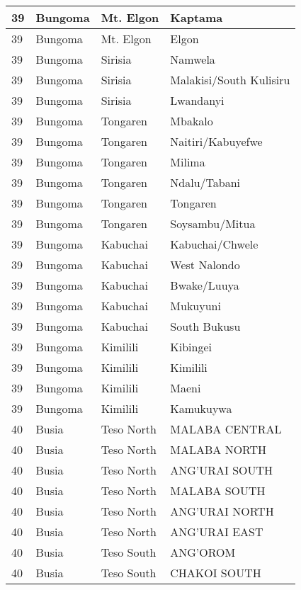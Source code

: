 \begin{table}[!ht]
\begin{tabular}{|l|l|l|l|}
        39 & Bungoma & Mt. Elgon & Kaptama \\ \hline
        39 & Bungoma & Mt. Elgon & Elgon \\ \hline
        39 & Bungoma & Sirisia & Namwela \\ \hline
        39 & Bungoma & Sirisia & Malakisi/South Kulisiru \\ \hline
        39 & Bungoma & Sirisia & Lwandanyi \\ \hline
        39 & Bungoma & Tongaren & Mbakalo \\ \hline
        39 & Bungoma & Tongaren & Naitiri/Kabuyefwe \\ \hline
        39 & Bungoma & Tongaren & Milima \\ \hline
        39 & Bungoma & Tongaren & Ndalu/Tabani \\ \hline
        39 & Bungoma & Tongaren & Tongaren \\ \hline
        39 & Bungoma & Tongaren & Soysambu/Mitua \\ \hline
        39 & Bungoma & Kabuchai & Kabuchai/Chwele \\ \hline
        39 & Bungoma & Kabuchai & West Nalondo \\ \hline
        39 & Bungoma & Kabuchai & Bwake/Luuya \\ \hline
        39 & Bungoma & Kabuchai & Mukuyuni \\ \hline
        39 & Bungoma & Kabuchai & South Bukusu \\ \hline
        39 & Bungoma & Kimilili & Kibingei \\ \hline
        39 & Bungoma & Kimilili & Kimilili \\ \hline
        39 & Bungoma & Kimilili & Maeni \\ \hline
        39 & Bungoma & Kimilili & Kamukuywa \\ \hline
        40 & Busia & Teso North & MALABA CENTRAL \\ \hline
        40 & Busia & Teso North & MALABA NORTH \\ \hline
        40 & Busia & Teso North & ANG’URAI SOUTH \\ \hline
        40 & Busia & Teso North & MALABA SOUTH \\ \hline
        40 & Busia & Teso North & ANG’URAI NORTH \\ \hline
        40 & Busia & Teso North & ANG’URAI EAST \\ \hline
        40 & Busia & Teso South & ANG’OROM \\ \hline
        40 & Busia & Teso South & CHAKOI SOUTH \\ \hline

\end{tabular}
\end{table}
